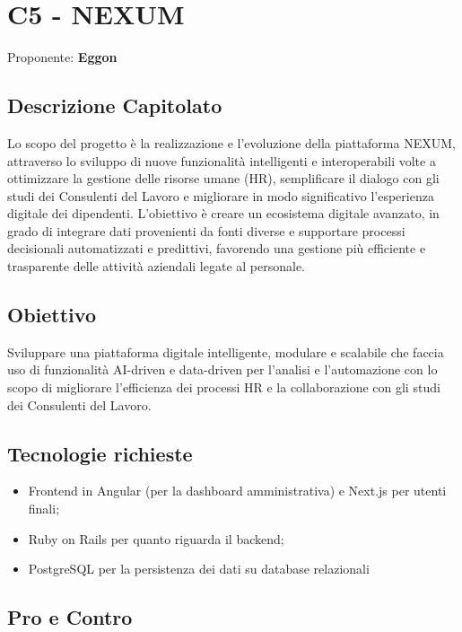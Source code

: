 \documentclass[a4paper,12pt]{article}
\begin{document}
\section{C5 - NEXUM}{
    Proponente: \textbf{Eggon}
    \subsection*{Descrizione Capitolato}{
        Lo scopo del progetto è la realizzazione e l'evoluzione della piattaforma NEXUM, attraverso lo sviluppo di nuove funzionalità intelligenti e interoperabili volte a ottimizzare la gestione delle risorse umane (HR), semplificare il dialogo con gli studi dei Consulenti del Lavoro e migliorare in modo significativo l'esperienza digitale dei dipendenti.
        L'obiettivo è creare un ecosistema digitale avanzato, in grado di integrare dati provenienti da fonti diverse e supportare processi decisionali automatizzati e predittivi, favorendo una gestione più efficiente e trasparente delle attività aziendali legate al personale.

    }

    \subsection*{Obiettivo}{
        Sviluppare una piattaforma digitale intelligente, modulare e scalabile che faccia uso di funzionalità AI-driven e data-driven per l'analisi e l'automazione con lo scopo di migliorare l'efficienza dei processi HR e la collaborazione con gli studi dei Consulenti del Lavoro.
    }

    \subsection*{Tecnologie richieste}{
        \begin{itemize}
            \item Frontend in Angular (per la dashboard amministrativa) e Next.js per utenti finali;
            \item Ruby on Rails per quanto riguarda il backend;
            \item PostgreSQL per la persistenza dei dati su database relazionali
        \end{itemize}
    }

    \subsection*{Pro e Contro}{

}}
\end{document}
